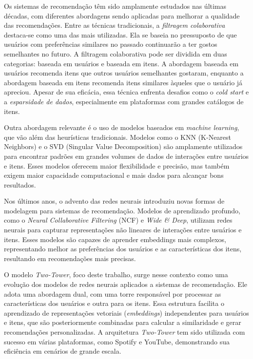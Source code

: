 \documentclass[sigconf]{acmart}
\begin{document}
Os sistemas de recomendação têm sido amplamente estudados nas últimas décadas, com diferentes abordagens sendo aplicadas para melhorar a qualidade das recomendações. Entre as técnicas tradicionais, a \textit{filtragem colaborativa} destaca-se como uma das mais utilizadas. Ela se baseia no pressuposto de que usuários com preferências similares no passado continuarão a ter gostos semelhantes no futuro. A filtragem colaborativa pode ser dividida em duas categorias: baseada em usuários e baseada em itens. A abordagem baseada em usuários recomenda itens que outros usuários semelhantes gostaram, enquanto a abordagem baseada em itens recomenda itens similares àqueles que o usuário já apreciou. Apesar de sua eficácia, essa técnica enfrenta desafios como o \textit{cold start} e a \textit{esparsidade de dados}, especialmente em plataformas com grandes catálogos de itens.

Outra abordagem relevante é o uso de modelos baseados em \textit{machine learning}, que vão além das heurísticas tradicionais. Modelos como o KNN (K-Nearest Neighbors) e o SVD (Singular Value Decomposition) são amplamente utilizados para encontrar padrões em grandes volumes de dados de interações entre usuários e itens. Esses modelos oferecem maior flexibilidade e precisão, mas também exigem maior capacidade computacional e mais dados para alcançar bons resultados.

Nos últimos anos, o advento das redes neurais introduziu novas formas de modelagem para sistemas de recomendação. Modelos de aprendizado profundo, como o \textit{Neural Collaborative Filtering} (NCF) e \textit{Wide \& Deep}, utilizam redes neurais para capturar representações não lineares de interações entre usuários e itens. Esses modelos são capazes de aprender embeddings mais complexos, representando melhor as preferências dos usuários e as características dos itens, resultando em recomendações mais precisas.

O modelo \textit{Two-Tower}, foco deste trabalho, surge nesse contexto como uma evolução dos modelos de redes neurais aplicados a sistemas de recomendação. Ele adota uma abordagem dual, com uma torre responsável por processar as características dos usuários e outra para os itens. Essa estrutura facilita o aprendizado de representações vetoriais (\textit{embeddings}) independentes para usuários e itens, que são posteriormente combinadas para calcular a similaridade e gerar recomendações personalizadas. A arquitetura \textit{Two-Tower} tem sido utilizada com sucesso em várias plataformas, como Spotify e YouTube, demonstrando sua eficiência em cenários de grande escala.
\end{document}
